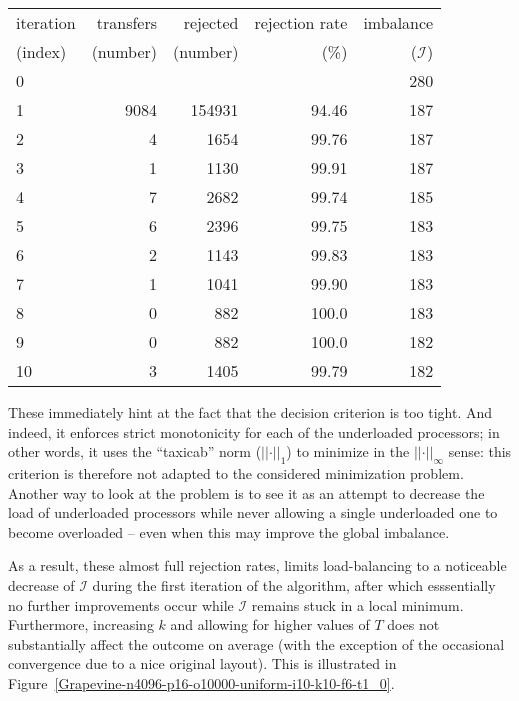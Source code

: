 \begin{center}
\begin{tabular}{@{}lrrrr@{}}
\hline
iteration & transfers & rejected & rejection rate & imbalance\\
(index)   & (number)  & (number) & (\%) & ($\mathcal{I}$)\\
\hline\hline
 0 &      &        &       & 280\\
 1 & 9084 & 154931 & 94.46 & 187\\
 2 &    4 &   1654 & 99.76 & 187\\
 3 &    1 &   1130 & 99.91 & 187\\
 4 &    7 &   2682 & 99.74 & 185\\
 5 &    6 &   2396 & 99.75 & 183\\
 6 &    2 &   1143 & 99.83 & 183\\
 7 &    1 &   1041 & 99.90 & 183\\
 8 &    0 &    882 & 100.0 & 183\\
 9 &    0 &    882 & 100.0 & 182\\
10 &    3 &   1405 & 99.79 & 182\\
\hline
\end{tabular}
\end{center}
These immediately hint at the fact that the decision criterion is too
tight. And indeed, it enforces strict monotonicity for each of the
underloaded processors; in other words, it uses the ``taxicab'' norm
($\vert\vert\cdot\vert\vert_1$) to minimize in the
$\vert\vert\cdot\vert\vert_\infty$ sense: this criterion is therefore
not adapted to the considered minimization problem.
Another way to look at the problem is to see it as an attempt to
decrease the load of underloaded processors while never allowing a
single underloaded one to become overloaded -- even when this may
improve the global imbalance.

As a result, these almost full rejection rates, limits load-balancing
to a noticeable decrease of $\mathcal{I}$ during the
first iteration of the algorithm, after which esssentially no further
improvements occur while $\mathcal{I}$ remains stuck in a local
minimum. Furthermore, increasing $k$ and allowing for higher values of
$T$ does not substantially affect the outcome on average (with the
exception of the occasional convergence due to a nice original layout).
This is illustrated in
Figure~\ref{Grapevine-n4096-p16-o10000-uniform-i10-k10-f6-t1_0}.




